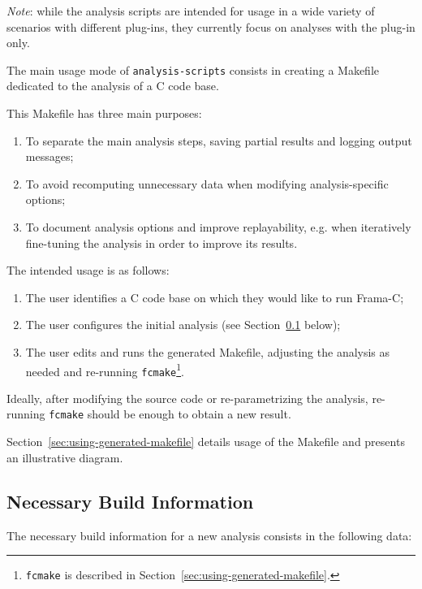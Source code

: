 {\em Note}: while the analysis scripts are intended for usage in a wide variety
of scenarios with different plug-ins, they currently focus
on analyses with the \Value plug-in only.

The main usage mode of \texttt{analysis-scripts} consists in creating a
Makefile dedicated to the analysis of a C code base.

This Makefile has three main purposes:

\begin{enumerate}
\item To separate the main analysis steps, saving partial results and logging
  output messages;
\item To avoid recomputing unnecessary data when modifying
  analysis-specific options;
\item To document analysis options and improve replayability, e.g. when
  iteratively fine-tuning the analysis in order to improve its results.
\end{enumerate}

The intended usage is as follows:

\begin{enumerate}
\item The user identifies a C code base on which they would like to run
  Frama-C;
\item The user configures the initial analysis
  (see Section~\ref{sec:necessary-build-information} below);
\item The user edits and runs the generated Makefile, adjusting the
  analysis as needed and re-running \texttt{fcmake}\footnote{\texttt{fcmake}
  is described in Section~\ref{sec:using-generated-makefile}.}.
\end{enumerate}

Ideally, after modifying the source code or re-parametrizing the analysis,
re-running \texttt{fcmake} should be enough to obtain a new result.

Section~\ref{sec:using-generated-makefile} details usage of the Makefile
and presents an illustrative diagram.

\subsection{Necessary Build Information}
\label{sec:necessary-build-information}

The necessary build information for a new analysis consists in the following
data:

